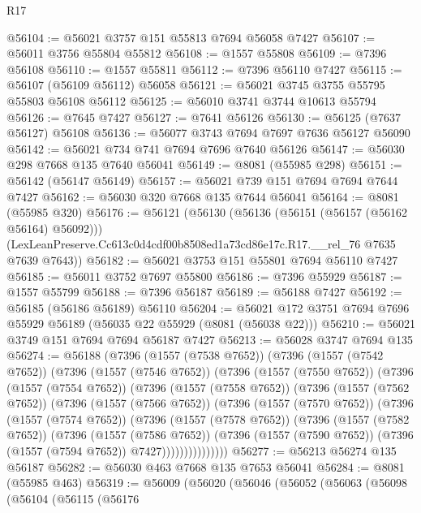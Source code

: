 \begin{lexlean}{R17}
\begin{coremodule}
@56104 := @56021 @3757 @151 @55813 @7694 @56058 @7427
@56107 := @56011 @3756 @55804 @55812
@56108 := @1557 @55808
@56109 := @7396 @56108
@56110 := @1557 @55811
@56112 := @7396 @56110 @7427
@56115 := @56107 (@56109 @56112) @56058
@56121 := @56021 @3745 @3755 @55795 @55803 @56108 @56112
@56125 := @56010 @3741 @3744 @10613 @55794
@56126 := @7645 @7427
@56127 := @7641 @56126
@56130 := @56125 (@7637 @56127) @56108
@56136 := @56077 @3743 @7694 @7697 @7636 @56127 @56090
@56142 := @56021 @734 @741 @7694 @7696 @7640 @56126
@56147 := @56030 @298 @7668 @135 @7640 @56041
@56149 := @8081 (@55985 @298)
@56151 := @56142 (@56147 @56149)
@56157 := @56021 @739 @151 @7694 @7694 @7644 @7427
@56162 := @56030 @320 @7668 @135 @7644 @56041
@56164 := @8081 (@55985 @320)
@56176 := @56121
    (@56130
      (@56136 (@56151 (@56157 (@56162 @56164) @56092)))
      (LexLeanPreserve.Cc613c0d4cdf00b8508ed1a73cd86e17c.R17.__rel_76 @7635 @7639 @7643))
@56182 := @56021 @3753 @151 @55801 @7694 @56110 @7427
@56185 := @56011 @3752 @7697 @55800
@56186 := @7396 @55929
@56187 := @1557 @55799
@56188 := @7396 @56187
@56189 := @56188 @7427
@56192 := @56185 (@56186 @56189) @56110
@56204 := @56021 @172 @3751 @7694 @7696 @55929 @56189 (@56035 @22 @55929 (@8081 (@56038 @22)))
@56210 := @56021 @3749 @151 @7694 @7694 @56187 @7427
@56213 := @56028 @3747 @7694 @135
@56274 := @56188
    (@7396
      (@1557 (@7538 @7652))
      (@7396
        (@1557 (@7542 @7652))
        (@7396
          (@1557 (@7546 @7652))
          (@7396
            (@1557 (@7550 @7652))
            (@7396
              (@1557 (@7554 @7652))
              (@7396
                (@1557 (@7558 @7652))
                (@7396
                  (@1557 (@7562 @7652))
                  (@7396
                    (@1557 (@7566 @7652))
                    (@7396
                      (@1557 (@7570 @7652))
                      (@7396
                        (@1557 (@7574 @7652))
                        (@7396
                          (@1557 (@7578 @7652))
                          (@7396
                            (@1557 (@7582 @7652))
                            (@7396
                              (@1557 (@7586 @7652))
                              (@7396
                                (@1557 (@7590 @7652))
                                (@7396 (@1557 (@7594 @7652)) @7427)))))))))))))))
@56277 := @56213 @56274 @135 @56187
@56282 := @56030 @463 @7668 @135 @7653 @56041
@56284 := @8081 (@55985 @463)
@56319 := @56009
    (@56020
      (@56046
        (@56052
          (@56063
            (@56098
              (@56104
                (@56115
                  (@56176

\end{coremodule}
\end{lexlean}
